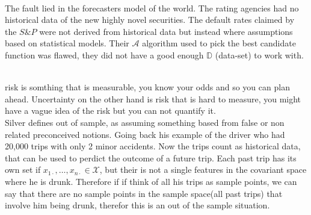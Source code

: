 \documentclass[12pt]{article}
\begin{document}
\begin{enumerate}
\\The fault lied in the forecasters model of the world. The rating agencies had no historical data of the new highly novel securities. The default rates claimed by the $S\&P$ were not derived from historical data but instead where assumptions based on statistical models. Their $\mathcal{A}$ algorithm used to pick the best candidate function was flawed, they did not have a good enough $\mathbb{D}$ (data-set) to work with.

\\risk is somthing that is measurable, you know your odds and so you can plan ahead. Uncertainty on the other hand is risk that is hard to measure, you might have a vague idea of the risk but you can not quantify it.
\\
Silver defines out of sample, as assuming something based from false or non related preconceived notions. Going back his example of the driver who had 20,000 trips with only 2 minor accidents. Now the trips count as historical data, that can be used to perdict the outcome of a future trip. Each past trip has its own set if $x_{1 \cdot}, \ldots, x_{n \cdot} \in \mathcal{X}$, but their is not  a single features in the covariant space where  he is drunk. Therefore if if think of all his trips as sample points, we can say that there are no sample points in the sample space(all past trips) that involve him being drunk, therefor this is an out of the sample situation. 

\end{enumerate}
\end{document}
